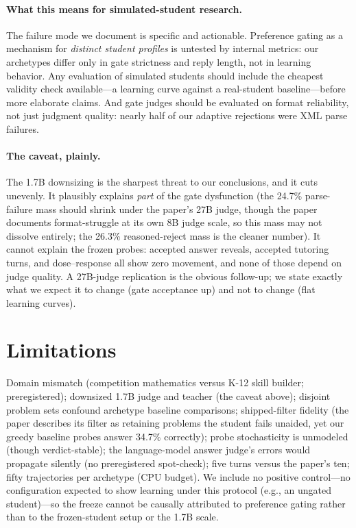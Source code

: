 \documentclass[12pt,a4paper]{article}
\begin{document}
\paragraph{What this means for simulated-student research.} The failure mode
we document is specific and actionable. Preference gating as a mechanism for
\emph{distinct student profiles} is untested by internal metrics: our
archetypes differ only in gate strictness and reply length, not in learning
behavior. Any evaluation of simulated students should include the cheapest
validity check available---a learning curve against a real-student
baseline---before more elaborate claims. And gate judges should be evaluated
on format reliability, not just judgment quality: nearly half of our adaptive
rejections were XML parse failures.

\paragraph{The caveat, plainly.} The 1.7B downsizing is the sharpest threat
to our conclusions, and it cuts unevenly. It plausibly explains \emph{part}
of the gate dysfunction (the 24.7\% parse-failure mass should shrink under
the paper's 27B judge, though the paper documents format-struggle at its own
8B judge scale, so this mass may not dissolve entirely; the 26.3\% reasoned-reject mass is the cleaner
number). It cannot explain the frozen probes: accepted answer reveals,
accepted tutoring turns, and dose--response all show zero movement, and none
of those depend on judge quality. A 27B-judge replication is the obvious
follow-up; we state exactly what we expect it to change (gate acceptance up)
and not to change (flat learning curves).

\section{Limitations}
\label{sec:limitations}

Domain mismatch (competition mathematics versus K-12 skill builder;
preregistered); downsized 1.7B judge and teacher (the caveat above);
disjoint problem sets confound archetype baseline comparisons; shipped-filter fidelity (the paper describes its filter as retaining problems the student fails unaided, yet our greedy baseline probes answer 34.7\% correctly); probe
stochasticity is unmodeled (though verdict-stable); the language-model
answer judge's errors would propagate silently (no preregistered
spot-check); five turns versus the paper's ten; fifty trajectories per
archetype (CPU budget). We include no positive control---no configuration
expected to show learning under this protocol (e.g., an ungated student)---so
the freeze cannot be causally attributed to preference gating rather than to
the frozen-student setup or the 1.7B scale.
\end{document}
